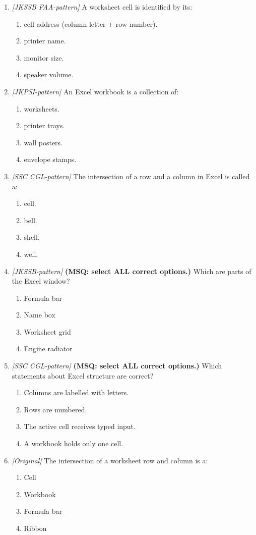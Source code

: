 \begin{enumerate}[label=\textbf{Q\arabic*.}, leftmargin=*]
\item \textit{[JKSSB FAA-pattern]} A worksheet cell is identified by its:
  \begin{enumerate}[label=\Alph*.]
    \item cell address (column letter + row number).
    \item printer name.
    \item monitor size.
    \item speaker volume.
  \end{enumerate}
\item \textit{[JKPSI-pattern]} An Excel workbook is a collection of:
  \begin{enumerate}[label=\Alph*.]
    \item worksheets.
    \item printer trays.
    \item wall posters.
    \item envelope stamps.
  \end{enumerate}
\item \textit{[SSC CGL-pattern]} The intersection of a row and a column in Excel is called a:
  \begin{enumerate}[label=\Alph*.]
    \item cell.
    \item bell.
    \item shell.
    \item well.
  \end{enumerate}
\item \textit{[JKSSB-pattern]} \textbf{(MSQ: select ALL correct options.)} Which are parts of the Excel window?
  \begin{enumerate}[label=\Alph*.]
    \item Formula bar
    \item Name box
    \item Worksheet grid
    \item Engine radiator
  \end{enumerate}
\item \textit{[SSC CGL-pattern]} \textbf{(MSQ: select ALL correct options.)} Which statements about Excel structure are correct?
  \begin{enumerate}[label=\Alph*.]
    \item Columns are labelled with letters.
    \item Rows are numbered.
    \item The active cell receives typed input.
    \item A workbook holds only one cell.
  \end{enumerate}
\item \textit{[Original]} The intersection of a worksheet row and column is a:
  \begin{enumerate}[label=\Alph*.]
\item Cell
   \item Workbook
   \item Formula bar
   \item Ribbon
  \end{enumerate}


\end{enumerate}
